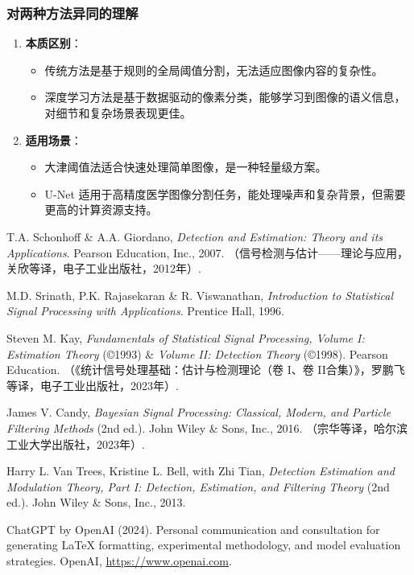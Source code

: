 \documentclass[12pt]{ctexart}
\begin{document}
\subsubsection*{对两种方法异同的理解}
\begin{enumerate}
    \item \textbf{本质区别}：
    \begin{itemize}
        \item 传统方法是基于规则的全局阈值分割，无法适应图像内容的复杂性。
        \item 深度学习方法是基于数据驱动的像素分类，能够学习到图像的语义信息，对细节和复杂场景表现更佳。
    \end{itemize}

    \item \textbf{适用场景}：
    \begin{itemize}
        \item 大津阈值法适合快速处理简单图像，是一种轻量级方案。
        \item U-Net 适用于高精度医学图像分割任务，能处理噪声和复杂背景，但需要更高的计算资源支持。
    \end{itemize}
\end{enumerate} 

\newpage

\begin{thebibliography}{99}

    T.A. Schonhoff \& A.A. Giordano, \textit{Detection and Estimation: Theory and its Applications}. Pearson Education, Inc., 2007. （信号检测与估计——理论与应用，关欣等译，电子工业出版社，2012年）.
    
    M.D. Srinath, P.K. Rajasekaran \& R. Viswanathan, \textit{Introduction to Statistical Signal Processing with Applications}. Prentice Hall, 1996.  
    
    Steven M. Kay, \textit{Fundamentals of Statistical Signal Processing, Volume I: Estimation Theory} (©1993) \& \textit{Volume II: Detection Theory} (©1998). Pearson Education. （《统计信号处理基础：估计与检测理论（卷 I、卷 II合集）》，罗鹏飞等译，电子工业出版社，2023年）.  
    
    James V. Candy, \textit{Bayesian Signal Processing: Classical, Modern, and Particle Filtering Methods} (2nd ed.). John Wiley \& Sons, Inc., 2016. （宗华等译，哈尔滨工业大学出版社，2023年）.  
    
    Harry L. Van Trees, Kristine L. Bell, with Zhi Tian, \textit{Detection Estimation and Modulation Theory, Part I: Detection, Estimation, and Filtering Theory} (2nd ed.). John Wiley \& Sons, Inc., 2013.  
    
    ChatGPT by OpenAI (2024). Personal communication and consultation for generating LaTeX formatting, experimental methodology, and model evaluation strategies. OpenAI, \url{https://www.openai.com}.  
    
\end{thebibliography}
    
    
\end{document}
